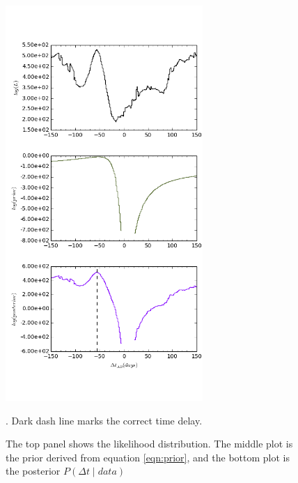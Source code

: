\documentclass[\docopts]{\docclass}
\begin{document}
\begin{enumerate}
\begin{figure}[!h]
\includegraphics[width=\textwidth, height=15cm, keepaspectratio]{data1_full_log.png}
\caption{The top panel shows the likelihood distribution. The middle plot is the prior derived from equation \ref{eqn:prior}, and the bottom plot is the posterior $P(\Delta t \mid data)$ }. Dark dash line marks the correct time delay. 
\label{fig:log_data1}
\end{figure}
\end{enumerate}
\end{document}
